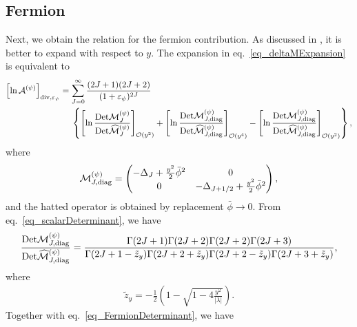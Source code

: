 \documentclass[12pt]{article}
\begin{document}
\subsection{Fermion}

Next, we obtain the relation for the fermion contribution. As discussed
in \cite{Andreassen:2017rzq}, it is better to expand with respect to
$y$. The expansion in eq.~\eqref{eq_deltaMExpansion} is equivalent to
\begin{align}
 \left[\ln\mathcal A^{(\psi)}\right]_{{\rm div},\eps{\psi}}
  & = \sum_{J=0}^{\infty} \frac{(2J+1)(2J+2)}{(1+\eps{\psi})^{2J}}\nonumber \\
  & \hspace{3ex}
 \left\{
  \left[
   \ln\frac{\det\mathcal M^{(\psi)}_J}{\det\widehat{\mathcal M}^{(\psi)}_J}
  \right]_{\mathcal O(y^2)}+
  \left[
   \ln\frac{\det\mathcal M^{(\psi)}_{J,{\rm diag}}}{\det\widehat{\mathcal M}^{(\psi)}_{J,{\rm diag}}}
  \right]_{\mathcal O(y^4)}-
  \left[
   \ln\frac{\det\mathcal M^{(\psi)}_{J,{\rm diag}}}{\det\widehat{\mathcal M}^{(\psi)}_{J,{\rm diag}}}
  \right]_{\mathcal O(y^2)}
 \right\},
\end{align}
where
\begin{align}
 \mathcal M^{(\psi)}_{J,{\rm diag}} =
 \begin{pmatrix}
  -\Delta_J+\frac{y^2}{2}\bar\phi^2 & 0                                       \\
  0                                 & -\Delta_{J+1/2}+\frac{y^2}{2}\bar\phi^2
 \end{pmatrix},
\end{align}
and the hatted operator is obtained by replacement $\bar\phi\to0$.  From
eq.~\eqref{eq_scalarDeterminant}, we have
\begin{align}
 \frac{\det\mathcal M^{(\psi)}_{J,{\rm diag}}}{\det\widehat{\mathcal M}^{(\psi)}_{J,{\rm diag}}}
 = \frac{\Gamma(2J+1)\Gamma(2J+2)\Gamma(2J+2)\Gamma(2J+3)}
 {\Gamma(2J+1-\tilde z_y)\Gamma(2J+2+\tilde z_y)\Gamma(2J+2-\tilde z_y)\Gamma(2J+3+\tilde z_y)},
\end{align}
where
\begin{align}
 \tilde{z}_y = -\frac{1}{2}\left(1-\sqrt{1-4\frac{y^2}{|\lambda|}}\right).
\end{align}
Together with eq.~\eqref{eq_FermionDeterminant}, we have
\end{document}
